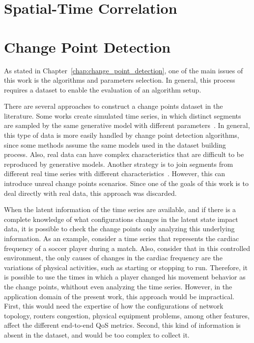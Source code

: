 \section{Spatial-Time Correlation}
\label{sec:spatial_time_correlation}

\section{Change Point Detection }

As stated in Chapter~\ref{chap:change_point_detection}, one of the main issues
of this work is the algorithms and parameters selection.
In general, this process requires a dataset to enable the evaluation of an
algorithm setup.

There are several approaches to construct a
change points dataset in the literature.
Some works create simulated time series, in which distinct segments are sampled
by the same generative model with different
parameters~\cite{change_point_detection_in_time_series_data_by_relative_density_ratio_estimation}.
In general, this type of data is more easily handled by change point detection
algorithms, since some methods assume the same models used in the dataset
building process. Also, real data can have complex characteristics that are
difficult to be reproduced by generative models. Another strategy is to join
segments from different real time series with different
characteristics~\cite{inertial_hidden_markov_models_modeling_change_in_multivariate_time_series}.
However, this can introduce unreal change points scenarios. Since one of
the goals of this work is to deal directly with real data,
this approach was discarded.

When the latent information of the time series are available, and if there is a
complete knowledge of what configurations changes in the latent state impact
data, it is possible to check the change points only analyzing this underlying
information. As an example, consider a time series that represents the cardiac
frequency of a soccer player during a match. Also, consider that in this
controlled environment, the only causes of changes in the cardiac frequency are
the variations of physical activities, such as starting or stopping to run.
Therefore,
it is possible to use the times in which a player changed his movement behavior
as the change points, whithout even analyzing the time series. However, in the
application domain of the present work, this approach would be impractical.
First, this would need the expertise of how the configurations of network
topology, routers congestion, physical equipment problems, among other features,
affect the different end-to-end QoS metrics.
Second, this kind of information is absent in the dataset, and would be too
complex to collect it.

